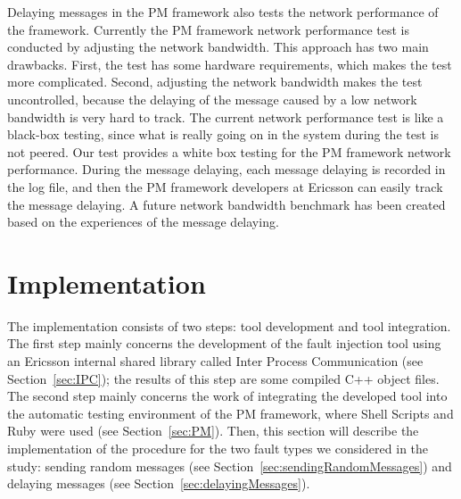Delaying messages in the PM framework also tests the network performance of the framework. %
Currently the PM framework network performance test is conducted by adjusting the network bandwidth. This approach has two main drawbacks. First, the test has some hardware requirements, which makes the test more complicated. Second, adjusting the network bandwidth makes the test uncontrolled, because the delaying of the message caused by a low network bandwidth is very hard to track. The current network performance test is like a black-box testing, since what is really going on in the system during the test is not peered. Our test provides a white box testing for the PM framework network performance. During the message delaying, each message delaying is recorded in the log file, and then the PM framework developers at Ericsson can easily track the message delaying. A future network bandwidth benchmark has been created based on the experiences of the message delaying.


\section{Implementation}\label{sec:implementation}

The implementation consists of two steps: tool development and tool integration. The first step mainly concerns the development of the fault injection tool using an Ericsson internal shared library called Inter Process Communication (see Section~\ref{sec:IPC}); the results of this step are some compiled C++ object files. The second step mainly concerns the work of integrating the developed tool into the automatic testing environment of the PM framework, where Shell Scripts and Ruby were used (see Section~\ref{sec:PM}). Then, this section will describe the implementation of the procedure for the two fault types we considered in the study: sending random messages (see Section~\ref{sec:sendingRandomMessages}) and delaying messages (see Section~\ref{sec:delayingMessages}).

